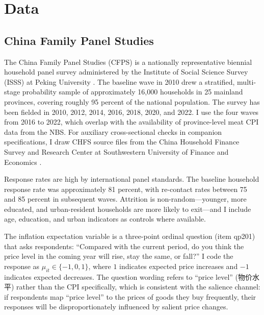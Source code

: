 
\section{Data}\label{sec:data}

\subsection{China Family Panel Studies}\label{sec:cfps}

The China Family Panel Studies (CFPS) is a nationally
representative biennial household panel survey administered
by the Institute of Social Science Survey (ISSS) at Peking
University \citep{CFPSData}.
The baseline wave in 2010 drew a stratified, multi-stage
probability sample of approximately 16,000 households in
25 mainland provinces, covering roughly 95 percent of the
national population.
The survey has been fielded in 2010, 2012, 2014, 2016, 2018,
2020, and 2022.
I use the four waves from 2016 to 2022, which overlap with
the availability of province-level meat CPI data from the NBS.
For auxiliary cross-sectional checks in companion specifications,
I draw CHFS source files from the China Household Finance Survey
and Research Center at Southwestern University of Finance and
Economics \citep{CHFSData}.

Response rates are high by international panel standards.
The baseline household response rate was approximately
81 percent, with re-contact rates between 75 and 85 percent
in subsequent waves.
Attrition is non-random---younger, more educated, and
urban-resident households are more likely to exit---and I
include age, education, and urban indicators as controls
where available.

The inflation expectation variable is a three-point ordinal
question (item qp201) that asks respondents: ``Compared with
the current period, do you think the price level in the coming
year will rise, stay the same, or fall?''
I code the response as $\mu_{it} \in \{-1, 0, 1\}$, where
$1$ indicates expected price increases and $-1$ indicates
expected decreases.
The question wording refers to ``price level'' (物价水平)
rather than the CPI specifically, which is consistent with
the salience channel: if respondents map ``price level'' to
the prices of goods they buy frequently, their responses will
be disproportionately influenced by salient price changes.

